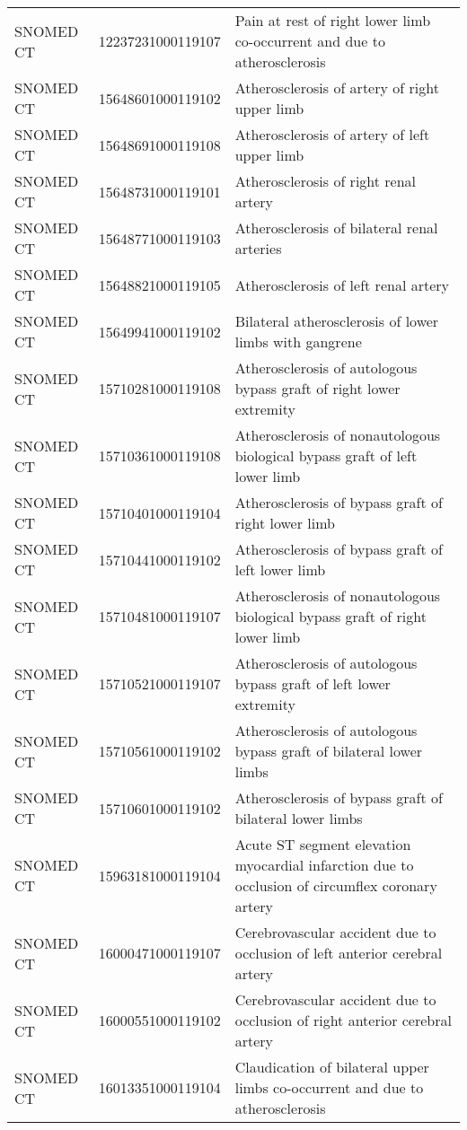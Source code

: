 \begin{longtable}{p{}p{}p{}}
  SNOMED CT & 12237231000119107 & Pain at rest of right lower limb co-occurrent and due to atherosclerosis \\ 
  SNOMED CT & 15648601000119102 & Atherosclerosis of artery of right upper limb \\ 
  SNOMED CT & 15648691000119108 & Atherosclerosis of artery of left upper limb \\ 
  SNOMED CT & 15648731000119101 & Atherosclerosis of right renal artery \\ 
  SNOMED CT & 15648771000119103 & Atherosclerosis of bilateral renal arteries \\ 
  SNOMED CT & 15648821000119105 & Atherosclerosis of left renal artery \\ 
  SNOMED CT & 15649941000119102 & Bilateral atherosclerosis of lower limbs with gangrene \\ 
  SNOMED CT & 15710281000119108 & Atherosclerosis of autologous bypass graft of right lower extremity \\ 
  SNOMED CT & 15710361000119108 & Atherosclerosis of nonautologous biological bypass graft of left lower limb \\ 
  SNOMED CT & 15710401000119104 & Atherosclerosis of bypass graft of right lower limb \\ 
  SNOMED CT & 15710441000119102 & Atherosclerosis of bypass graft of left lower limb \\ 
  SNOMED CT & 15710481000119107 & Atherosclerosis of nonautologous biological bypass graft of right lower limb \\ 
  SNOMED CT & 15710521000119107 & Atherosclerosis of autologous bypass graft of left lower extremity \\ 
  SNOMED CT & 15710561000119102 & Atherosclerosis of autologous bypass graft of bilateral lower limbs \\ 
  SNOMED CT & 15710601000119102 & Atherosclerosis of bypass graft of bilateral lower limbs \\ 
  SNOMED CT & 15963181000119104 & Acute ST segment elevation myocardial infarction due to occlusion of circumflex coronary artery \\ 
  SNOMED CT & 16000471000119107 & Cerebrovascular accident due to occlusion of left anterior cerebral artery \\ 
  SNOMED CT & 16000551000119102 & Cerebrovascular accident due to occlusion of right anterior cerebral artery \\ 
  SNOMED CT & 16013351000119104 & Claudication of bilateral upper limbs co-occurrent and due to atherosclerosis \\ 

\end{longtable}
